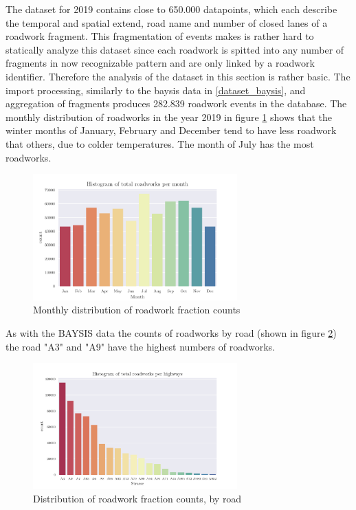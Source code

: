 \documentclass[a4paper,headsepline,footsepline,fontsize=11pt,BCOR=12mm,DIV=12]{report}
\begin{document}
The dataset for 2019 contains close to 650.000 datapoints, which each describe the temporal and spatial extend, road name and number of closed lanes of a roadwork fragment. This fragmentation of events makes is rather hard to statically analyze this dataset since each roadwork is spitted into any number of fragments in now recognizable pattern and are only linked by a roadwork identifier. Therefore the analysis of the dataset in this section is rather basic. The import processing, similarly to the \acrshort{baysis} data in \ref{dataset_baysis}, and aggregation of fragments produces 282.839 roadwork events in the database. The monthly distribution of roadworks in the year 2019 in figure \ref{img:arbis_dataset_dist_month} shows that the winter months of January, February and December tend to have less roadwork that others, due to colder temperatures. The month of July has the most roadworks.

\begin{figure}[h]
	\centering
	\includegraphics[width=0.7\textwidth]{../CorrAnalysis/data/ArbIS/01_dataset/plots/arbis_dataset_hist_month}
	\caption{Monthly distribution of roadwork fraction counts}
	\label{img:arbis_dataset_dist_month}
\end{figure}

As with the BAYSIS data the counts of roadworks by road (shown in figure \ref{img:arbis_dataset_dist_highway}) the road "A3" and "A9" have the highest numbers of roadworks.

\begin{figure}[h]
	\centering
	\includegraphics[width=0.7\textwidth]{../CorrAnalysis/data/ArbIS/01_dataset/plots/arbis_dataset_hist_highway}
	\caption{Distribution of roadwork fraction counts, by road}
	\label{img:arbis_dataset_dist_highway}
\end{figure}
\end{document}
